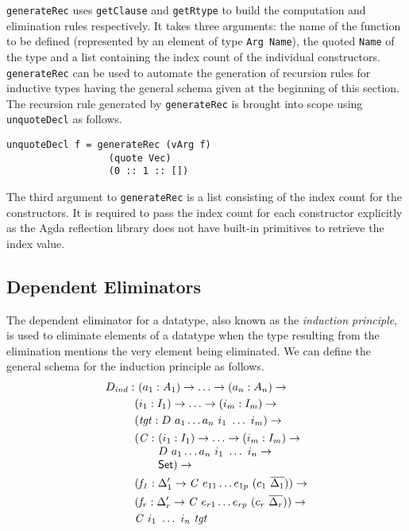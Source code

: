 \documentclass[sigplan,10pt]{acmart}
\begin{document}
{\tt generateRec} uses {\tt getClause} and {\tt getRtype} to build the computation and elimination rules respectively. It takes three arguments: the name of the function to be defined (represented by an element of type {\tt Arg Name}), the quoted {\tt Name} of the type and a list containing the index count of the individual constructors. {\tt generateRec} can be used to automate the generation of recursion rules for inductive types having the general schema given at the beginning of this section. The recursion rule generated by {\tt generateRec} is brought into scope using {\tt unquoteDecl} as follows.

\begin{center}
\begingroup
\begin{BVerbatim}
unquoteDecl f = generateRec (vArg f)
                  (quote Vec) 
                  (0 :: 1 :: [])
\end{BVerbatim}
\endgroup
\end{center}

The third argument to {\tt generateRec} is a list consisting of the index count for the constructors. It is required to pass the index count for each constructor explicitly as the Agda reflection library does not have built-in primitives to retrieve the index value.

\subsection{Dependent Eliminators}
\label{sec:sec3.2}

The dependent eliminator for a datatype, also known as the \emph{induction principle}, is used to eliminate elements of a datatype when the type resulting from the elimination mentions the very element being eliminated. We can define the general schema for the induction principle as follows.
\begin{align*}
D_{\mathit{ind}} : &\ (a_1 : A_1) \to \ldots \to (a_n : A_n) \to\\
& (i_1 : I_1) \to \ldots \to (i_m : I_m) \to\\
& (\mathit{tgt} : D\ a_1 \ldots a_n\ i_1\ \ldots\ i_m) \to\\
& \begin{array}{@{}l@{}l}(\mathit{C} :\ & (i_1 : I_1) \to \ldots \to (i_m : I_m) \to\\  & D\ a_1 \ldots a_n\ i_1\ \ldots\ i_n \to\\ &\SET{})\to\end{array} \\
& (\mathit{f_1} : \Delta_1^\prime \to \mathit{C}\ e_{11} \ldots e_{1p}\ (c_1\ \overline{\Delta_1})) \to \\
& (\mathit{f_r} : \Delta_r^\prime \to \mathit{C}\ e_{r1} \ldots e_{rp}\ (c_r\ \overline{\Delta_r})) \to \\
& \mathit{C}\ i_1\ \ldots\ i_n\ \mathit{tgt}
\end{align*}
\end{document}
